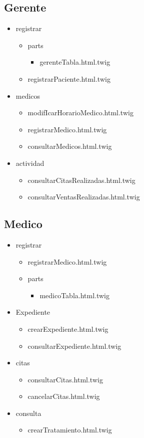 		\subsection{Gerente}
		\begin{itemize}
			\item registrar
			\begin{itemize}
				\item parts 
				\begin{itemize}
				\item gerenteTabla.html.twig
				\end{itemize}
				\item registrarPaciente.html.twig
			\end{itemize}
			\item medicos 
			\begin{itemize}
			\item modifIcarHorarioMedico.html.twig
			\item registrarMedico.html.twig
			\item consultarMedicos.html.twig
			\end{itemize}
			\item actividad
			\begin{itemize}
				\item consultarCitasRealizadas.html.twig
				\item consultarVentasRealizadas.html.twig
			\end{itemize}
		\end{itemize}
		\subsection{Medico}
		\begin{itemize}
			\item registrar
			\begin{itemize}
			\item registrarMedico.html.twig
			\item parts
			\begin{itemize}
				\item medicoTabla.html.twig
			\end{itemize}
			\end{itemize}
			\item Expediente 
			\begin{itemize}
				\item crearExpediente.html.twig
				\item consultarExpediente.html.twig
			\end{itemize}
			\item citas
			\begin{itemize}
				\item consultarCitas.html.twig
				\item cancelarCitas.html.twig
			\end{itemize}
			\item consulta
			\begin{itemize}
				\item crearTratamiento.html.twig				
			\end{itemize}
		\end{itemize}
